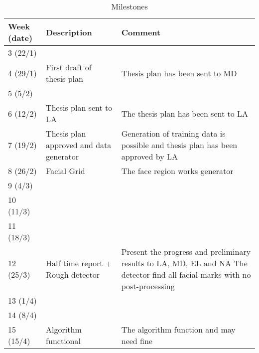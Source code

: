 \begin{table}[H]
\centering
\caption{Milestones}
\label{table:milestones}
\begin{tabular}{|p{}|p{}|p{}|}
	\hline
	\textbf{Week (date)} & \textbf{Description}                    & \textbf{Comment}                                                                                                                      \\ \hline
	3 (22/1)             &                                         &  \\ \hline
	4 (29/1)             & First draft of thesis plan              & Thesis plan has been sent to MD                                                                                                       \\ \hline
	5 (5/2)              &                                         &  \\ \hline
	6 (12/2)             & Thesis plan sent to LA                  & The thesis plan has been sent to LA                                                                                                   \\ \hline
	7 (19/2)             & Thesis plan approved and data generator & Generation of training data is possible and thesis plan has been approved by LA                                                       \\ \hline
	8 (26/2)             & Facial Grid                             & The face region works generator                                                                                                       \\ \hline
	9 (4/3)              &                                         &  \\ \hline
	10 (11/3)            &                                         &  \\ \hline
	11 (18/3)            &                                         &  \\ \hline
	12 (25/3)            & Half time report + Rough detector       & Present the progress and preliminary results to LA, MD, EL and NA \newline The detector find all facial marks with no post-processing \\ \hline
	13 (1/4)             &                                         &  \\ \hline
	14 (8/4)             &                                         &  \\ \hline
	15 (15/4)            & Algorithm functional                    & The algorithm function and may need fine                                                                                              \\ \hline

\end{tabular}
\end{table}
